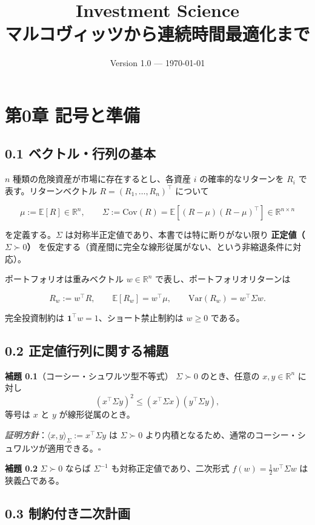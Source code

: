 \documentclass[11pt,a4paper]{report}
\title{Investment Science \\ \large マルコヴィッツから連続時間最適化まで}
\author{}
\date{Version 1.0 — \today}
\begin{document}
\maketitle
\tableofcontents
\clearpage

\chapter{第0章 記号と準備}

\section{0.1 ベクトル・行列の基本}

$n$ 種類の危険資産が市場に存在するとし、各資産 $i$ の確率的なリターンを $R_i$ で表す。リターンベクトル $R = (R_1, \dots, R_n)^\top$ について

\[ \mu := \mathbb{E}[R] \in \mathbb{R}^n, \qquad \Sigma := \mathrm{Cov}(R) = \mathbb{E}[(R-\mu)(R-\mu)^\top] \in \mathbb{R}^{n\times n} \]

を定義する。$\Sigma$ は対称半正定値であり、本書では特に断りがない限り \textbf{正定値（$\Sigma \succ 0$）} を仮定する（資産間に完全な線形従属がない、という非縮退条件に対応）。

ポートフォリオは重みベクトル $w \in \mathbb{R}^n$ で表し、ポートフォリオリターンは

\[ R_w := w^\top R, \qquad \mathbb{E}[R_w] = w^\top \mu, \qquad \mathrm{Var}(R_w) = w^\top \Sigma w. \]

完全投資制約は $\mathbf{1}^\top w = 1$、ショート禁止制約は $w \ge 0$ である。

\section{0.2 正定値行列に関する補題}

\textbf{補題 0.1}（コーシー・シュワルツ型不等式） $\Sigma \succ 0$ のとき、任意の $x, y \in \mathbb{R}^n$ に対し \[ (x^\top \Sigma y)^2 \le (x^\top \Sigma x)(y^\top \Sigma y), \] 等号は $x$ と $y$ が線形従属のとき。

\emph{証明方針}：$\langle x, y\rangle_\Sigma := x^\top \Sigma y$ は $\Sigma \succ 0$ より内積となるため、通常のコーシー・シュワルツが適用できる。$\square$

\textbf{補題 0.2} $\Sigma \succ 0$ ならば $\Sigma^{-1}$ も対称正定値であり、二次形式 $f(w) = \tfrac{1}{2} w^\top \Sigma w$ は狭義凸である。

\section{0.3 制約付き二次計画}
\end{document}
